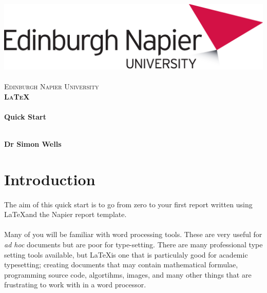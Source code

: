 \documentclass[10pt, a4paper, twosize]{article}
\begin{document}

\begin{titlepage}
\vspace*{5cm}
\begin{center}
\includegraphics[width=.5\textwidth]{images/EdNapUniLogoCMYK}~\\[1cm]

\textsc{\Large Edinburgh Napier University}\\[1.5cm]

\textsc{\LARGE \bfseries \LaTeX}\\[0.5cm]

\hrulefill \\[0.4cm]
{\huge \bfseries Quick Start \\[0.4cm] }
\hrulefill \\[1.5cm]

\begin{minipage}{0.4\textwidth}
\begin{flushleft} \large
\textbf{Dr Simon Wells} \\
\end{flushleft}
\end{minipage}

\vfill

\end{center}
\end{titlepage}




%

\section{Introduction}
\paragraph{} The aim of this quick start is to go from zero to your first report written using \LaTeX and the Napier report template.

\paragraph{} Many of you will be familiar with word processing tools. These are very useful for \emph{ad hoc} documents but are poor for type-setting. There are many professional type setting tools available, but \LaTeX is one that is particulaly good for academic typesetting; creating documents that may contain mathematical formulae, programming source code, algortihms, images, and many other things that are frustrating to work with in a word processor.
\end{document}
